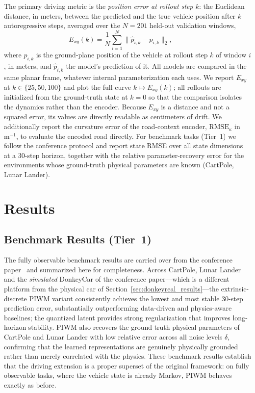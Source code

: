 \documentclass[preprint,12pt]{elsarticle}
\begin{document}
The primary driving metric is the \emph{position error at rollout step $k$}: the
Euclidean distance, in meters, between the predicted and the true vehicle
position after $k$ autoregressive steps, averaged over the $N = 201$ held-out
validation windows,
\begin{equation}
    E_{xy}(k) = \frac{1}{N}\sum_{i=1}^{N}
    \bigl\lVert \hat{p}_{i,k} - p_{i,k} \bigr\rVert_2 ,
    \qquad
    \label{eq:metric_exy}
\end{equation}
where $p_{i,k}$ is the ground-plane position of the vehicle at rollout step $k$ of
window $i$, in meters, and $\hat{p}_{i,k}$ the model's prediction of it. All models
are compared in the same planar frame, whatever internal parameterization each
uses.
We report $E_{xy}$ at $k \in \{25, 50, 100\}$ and plot the full curve
$k \mapsto E_{xy}(k)$; all rollouts are initialized from the ground-truth state at
$k=0$ so that the comparison isolates the dynamics rather than the encoder.
Because $E_{xy}$ is a distance and not a squared error, its values are directly
readable as centimeters of drift.
We additionally report the curvature error of the road-context encoder,
$\mathrm{RMSE}_\kappa$ in $\mathrm{m}^{-1}$, to evaluate the encoded road
directly.
For benchmark tasks (Tier~1) we follow the conference protocol and report state
RMSE over all state dimensions at a 30-step horizon, together with the relative
parameter-recovery error for the environments whose ground-truth physical
parameters are known (CartPole, Lunar Lander).


\section{Results}\label{sec:results}

\subsection{Benchmark Results (Tier~1)}\label{sec:conf_results}

The fully observable benchmark results are carried over from the conference
paper~\cite{piwm_conf} and summarized here for completeness.
Across CartPole, Lunar Lander and the \emph{simulated} DonkeyCar of the conference
paper---which is a different platform from the physical car of
Section~\ref{sec:donkeyreal_results}---the extrinsic-discrete PIWM variant
consistently achieves the lowest and most stable 30-step prediction error,
substantially outperforming data-driven and physics-aware baselines; the quantized
latent provides strong regularization that improves long-horizon stability.
PIWM also recovers the ground-truth physical parameters of CartPole and Lunar
Lander with low relative error across all noise levels $\delta$, confirming that
the learned representations are genuinely physically grounded rather than merely
correlated with the physics.
These benchmark results establish that the driving extension is a proper superset
of the original framework: on fully observable tasks, where the vehicle state is
already Markov, PIWM behaves exactly as before.
\end{document}
